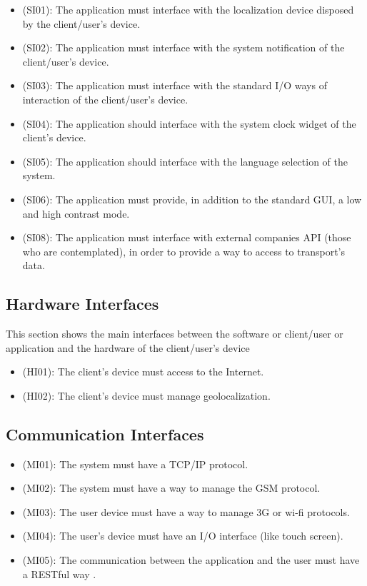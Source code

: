 \documentclass[a4paper,leqno]{book}
\begin{document}
\begin{itemize}
\item (SI01): The application must interface with the localization device disposed by the client/user's device.
\item (SI02): The application must interface with the system notification of the client/user's device.
\item (SI03): The application must interface with the standard I/O ways of interaction of the client/user's device.
\item (SI04): The application should interface with the system clock widget of the client's device.
\item (SI05): The application should interface with the language selection of the system.
\item (SI06): The application must provide, in addition to the standard GUI, a low and high contrast mode. 
\item (SI08): The application must interface with external companies API (those who are contemplated), in order to provide a way to access to transport's data.
\end{itemize}

\subsection{Hardware Interfaces}
This section shows the main interfaces between the software or client/user or application and the hardware of the client/user's device

\begin{itemize}
\item (HI01): The client's device must access to the Internet.
\item (HI02): The client's device must manage geolocalization. 
\end{itemize}

\subsection{Communication Interfaces}

\begin{itemize}
\item (MI01): The system must have a TCP/IP protocol.
\item (MI02): The system must have a way to manage the GSM protocol.
\item (MI03): The user device must have a way to manage 3G or wi-fi protocols.
\item (MI04): The user's device must have an I/O interface (like touch screen).
\item (MI05): The communication between the application and the user must have a RESTful way .
\end{itemize}
\end{document}

